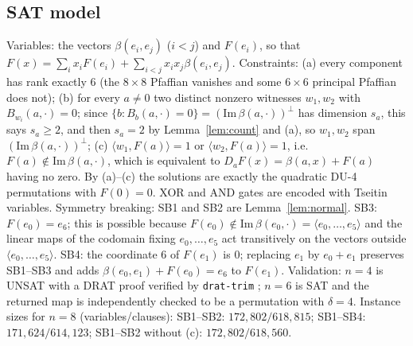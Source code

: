 \subsection{SAT model}
Variables: the vectors $\beta(e_i,e_j)$ ($i<j$) and $F(e_i)$, so that
$F(x)=\sum_ix_iF(e_i)+\sum_{i<j}x_ix_j\beta(e_i,e_j)$. Constraints: (a) every component has
rank exactly $6$ (the $8\times 8$ Pfaffian vanishes and some $6\times 6$ principal Pfaffian
does not); (b) for every $a\neq 0$ two distinct nonzero witnesses $w_1,w_2$ with
$B_{w_i}(a,\cdot)=0$; since $\{b:B_b(a,\cdot)=0\}=(\mathrm{Im}\,\beta(a,\cdot))^\perp$ has
dimension $s_a$, this says $s_a\ge 2$, and then $s_a=2$ by Lemma~\ref{lem:count} and (a), so
$w_1,w_2$ span $(\mathrm{Im}\,\beta(a,\cdot))^\perp$; (c) $\langle w_1,F(a)\rangle=1$ or
$\langle w_2,F(a)\rangle=1$, i.e.\ $F(a)\notin\mathrm{Im}\,\beta(a,\cdot)$, which is equivalent to
$D_aF(x)=\beta(a,x)+F(a)$ having no zero. By (a)--(c) the solutions are exactly the quadratic
DU-4 permutations with $F(0)=0$. XOR and AND gates are encoded with Tseitin variables.
Symmetry breaking: SB1 and SB2 are Lemma~\ref{lem:normal}. SB3: $F(e_0)=e_6$; this is possible
because $F(e_0)\notin\mathrm{Im}\,\beta(e_0,\cdot)=\langle e_0,\dots,e_5\rangle$ and the linear
maps of the codomain fixing $e_0,\dots,e_5$ act transitively on the vectors outside
$\langle e_0,\dots,e_5\rangle$. SB4: the coordinate $6$ of $F(e_1)$ is $0$; replacing $e_1$ by
$e_0+e_1$ preserves SB1--SB3 and adds $\beta(e_0,e_1)+F(e_0)=e_6$ to $F(e_1)$.
Validation: $n=4$ is UNSAT with a DRAT proof verified by \texttt{drat-trim} \cite{WHH14};
$n=6$ is SAT and the returned map is independently checked to be a permutation with $\delta=4$.
Instance sizes for $n=8$ (variables/clauses): SB1--SB2: $172{,}802/618{,}815$; SB1--SB4:
$171{,}624/614{,}123$; SB1--SB2 without (c): $172{,}802/618{,}560$.


